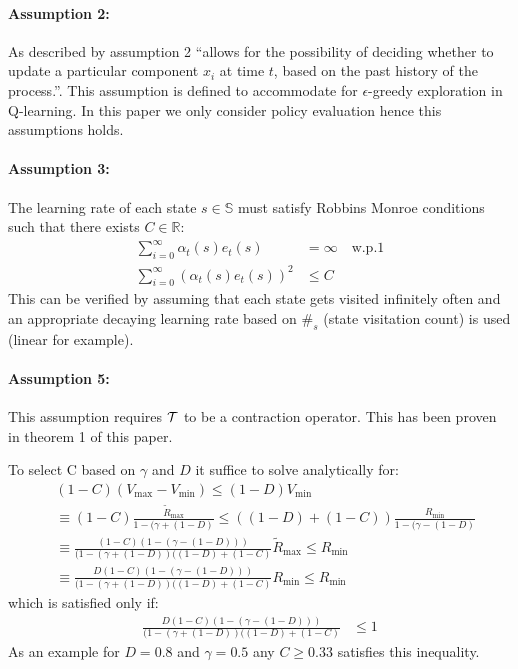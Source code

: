 \paragraph{Assumption 2: } As described by \citep{tsitsiklis1994asynchronous} assumption 2 ``allows for the possibility of deciding whether to update a particular component $x_i$ at time $t$, based on the past history of the process.''. This assumption is defined to accommodate for $\epsilon$-greedy exploration in Q-learning. In this paper we only consider policy evaluation hence this assumptions holds.
\paragraph{ Assumption 3:} The learning rate of each state $s \in \mathbb{S}$ must satisfy Robbins Monroe conditions such that there exists $C \in \mathbb{R}$:
\begin{equation}
    \begin{split}
        \sum_{i=0}^{\infty} \alpha_t(s) 
e_t(s) &= \infty \quad \text{w.p.1}\\
        \sum_{i=0}^{\infty} (\alpha_t(s) e_t(s))^2 &\leq C      \end{split}
\end{equation}
This can be verified by assuming that each state gets visited infinitely often and an appropriate decaying learning rate based on $\#_s$ (state visitation count) is used (linear for example). 
\paragraph{Assumption 5:} This assumption requires $\mathcal{T}$ to be a contraction operator. This has been proven in theorem 1 of this paper.

To select C based on $\gamma$ and $D$ it suffice to solve analytically for:
\begin{equation}
\begin{split}
    &(1-C)(V_{\max} - V_{\min}) \leq (1-D)V_{\min} \\
    &\equiv (1-C)\frac{\widetilde{R}_{\max}}{1-(\gamma + (1-D)} \leq ((1-D)+(1-C)) \frac{R_{\min}}{1-(\gamma - (1-D)}\\
    &\equiv \frac{(1-C)(1-(\gamma-(1-D)))}{(1-(\gamma + (1-D))((1-D)+(1-C)} \widetilde{R}_{\max}\leq R_{\min} \\
    &\equiv \frac{D(1-C)(1-(\gamma-(1-D)))}{(1-(\gamma + (1-D))((1-D)+(1-C)} R_{\min} \leq R_{\min}
\end{split}
\end{equation}
which is satisfied only if:
\begin{equation}
\begin{split}
    \frac{D(1-C)(1-(\gamma-(1-D)))}{(1-(\gamma + (1-D))((1-D)+(1-C)} &\leq 1
\end{split}
\end{equation}
As an example for $D = 0.8$ and $\gamma = 0.5$ any $C\geq 0.33$ satisfies this inequality.

